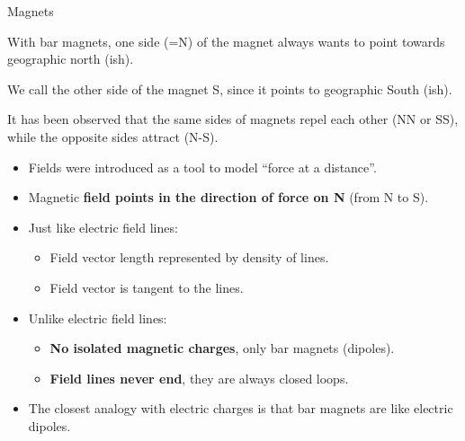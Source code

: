 \documentclass[aspectratio=169,
hyperref={colorlinks,urlcolor=blue}
]{beamer}
\begin{document}

\begin{bulletframe}{Magnets}
\item With bar magnets, one side (=N) of the magnet always wants to point towards geographic north (ish).
\item We call the other side of the magnet S, since it points to geographic South (ish).
\item It has been observed that the same sides of magnets repel each other (NN or SS), while the opposite sides attract (N-S).
\end{bulletframe}



{
\vspace{-0.25cm}
\begin{itemize}
\item Fields were introduced as a tool to model ``force at a distance''.
\item Magnetic \textbf{field points in the direction of force on N} (from N to S).
\item Just like electric field lines:
\begin{itemize}
\item Field vector length represented by density of lines.
\item Field vector is tangent to the lines.
\end{itemize}
\item Unlike electric field lines:
\begin{itemize}
\item \textbf{No isolated magnetic charges}, only bar magnets (dipoles).
\item \textbf{Field lines never end}, they are always closed loops.
\end{itemize}
\item The closest analogy with electric charges is that bar magnets are like electric dipoles.
\end{itemize}
}
{
\vspace{-1cm}
\vspace{-0.75cm}
}





\end{document}
